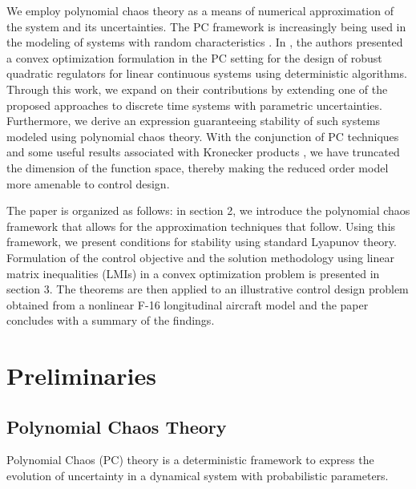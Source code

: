\documentclass[letterpaper, 10 pt, conference]{ieeeconf}  %
\begin{document}
We employ polynomial chaos theory as a means of numerical approximation \cite{xiu2002wiener} of the system and its uncertainties.
The PC framework is increasingly being used in the modeling of systems with random characteristics
 \cite{fisher2009linear}. In \cite{bhattacharya2019robust}, the authors presented a convex optimization formulation in the PC setting for the design of robust quadratic regulators for linear continuous systems \cite{stengel1991stochastic, polyak2001probabilistic} using deterministic algorithms.
Through this work, we expand on their contributions by extending one of the proposed approaches to discrete time systems with parametric uncertainties.
Furthermore, we derive an expression guaranteeing stability of such systems modeled using polynomial chaos theory.
With the conjunction of PC techniques and some useful results associated with Kronecker products \cite{bhattacharya2014robust}, we have truncated the dimension of the function space, thereby making the reduced order model more amenable to control design.

The paper is organized as follows: in section 2, we introduce the polynomial chaos framework that allows for the approximation techniques that follow. Using this framework, we present conditions for stability using standard Lyapunov theory. Formulation of the control objective and the solution methodology using linear matrix inequalities (LMIs) in a convex optimization problem is presented in section 3. The theorems are then applied to an illustrative control design problem obtained from a nonlinear F-16 longitudinal aircraft model \cite{stevens2015aircraft} and the paper concludes with a summary of the findings.
\section{Preliminaries}
\subsection{Polynomial Chaos Theory}
Polynomial Chaos (PC) theory is a deterministic framework to express the evolution of uncertainty in a dynamical system with probabilistic parameters.
\end{document}
